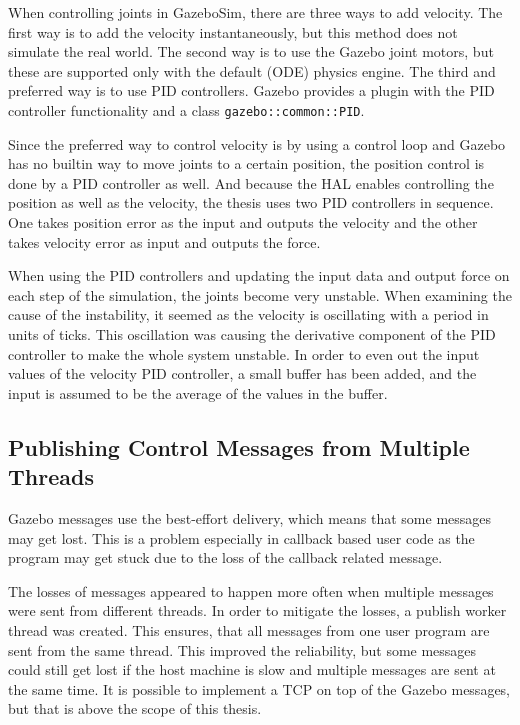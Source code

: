 \documentclass[
  digital, %
  table,   %
  oneside, %
  nolof,     %
  nolot,     %
]{fithesis3}
\newcommand{\code}[1]{\texttt{#1}}
\begin{document}
When controlling joints in GazeboSim, there are three ways to add velocity.
The first way is to add the velocity instantaneously, but this method does not simulate the real world.
The second way is to use the Gazebo joint motors, but these are supported only with the default (ODE) physics engine.
The third and preferred way is to use PID controllers.
Gazebo provides a plugin with the PID controller functionality and a class \code{gazebo::common::PID}.

Since the preferred way to control velocity is by using a control loop and Gazebo has no builtin way to move joints to a certain position, the position control is done by a PID controller as well.
And because the HAL enables controlling the position as well as the velocity, the thesis uses two PID controllers in sequence.
One takes position error as the input and outputs the velocity and the other takes velocity error as input and outputs the force.

When using the PID controllers and updating the input data and output force on each step of the simulation, the joints become very unstable.
When examining the cause of the instability, it seemed as the velocity is oscillating with a period in units of ticks.
This oscillation was causing the derivative component of the PID controller to make the whole system unstable.
In order to even out the input values of the velocity PID controller, a small buffer has been added, and the input is assumed to be the average of the values in the buffer.

\subsection{Publishing Control Messages from Multiple Threads}

Gazebo messages use the best-effort delivery, which means that some messages may get lost.
This is a problem especially in callback based user code as the program may get stuck due to the loss of the callback related message.

The losses of messages appeared to happen more often when multiple messages were sent from different threads.
In order to mitigate the losses, a publish worker thread was created.
This ensures, that all messages from one user program are sent from the same thread.
This improved the reliability, but some messages could still get lost if the host machine is slow and multiple messages are sent at the same time.
It is possible to implement a TCP on top of the Gazebo messages, but that is above the scope of this thesis.
\end{document}
